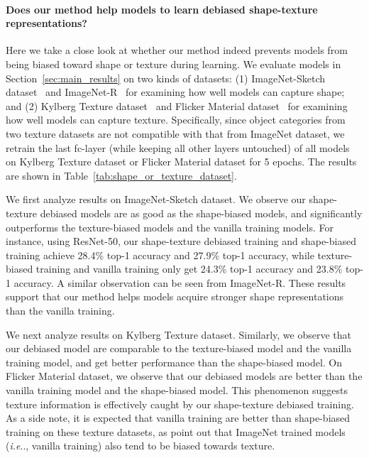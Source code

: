 \documentclass{article} \usepackage{iclr2021_conference,times}
\makeatletter
\DeclareRobustCommand\onedot{\futurelet\@let@token\@onedot}
\def\@onedot{\ifx\@let@token.\else.\null\fi\xspace}
\def\ie{\emph{i.e}\onedot} \def\Ie{\emph{I.e}\onedot}
\makeatother
\begin{document}
\paragraph{Does our method help models to learn debiased shape-texture representations?}
Here we take a close look at whether our method indeed prevents models from being biased toward shape or texture during learning. We evaluate models in Section~\ref{sec:main_results} on two kinds of datasets: (1) ImageNet-Sketch dataset~\citep{wang2019learning} and ImageNet-R~\citep{hendrycks2020many} for examining how well models can capture shape; and
(2) Kylberg Texture dataset~\citep{kylberg2011kylberg} and Flicker Material dataset~\citep{Sharan-JoV-14} for examining how well models can capture texture. Specifically, since object categories from two texture datasets are not compatible with that from ImageNet dataset, we retrain the last fc-layer (while keeping all other layers untouched) of all models on Kylberg Texture dataset or Flicker Material dataset for 5 epochs. The results are shown in Table~\ref{tab:shape_or_texture_dataset}.

We first analyze results on ImageNet-Sketch dataset. We observe our shape-texture debiased models are as good as the shape-biased models, and significantly outperforms the texture-biased models and the vanilla training models. For instance, using ResNet-50, our shape-texture debiased training and shape-biased training achieve 28.4\% top-1 accuracy and 27.9\% top-1 accuracy, while texture-biased training and vanilla training only get 24.3\% top-1 accuracy and 23.8\% top-1 accuracy. A similar observation can be seen from ImageNet-R. These results support that our method helps models acquire stronger shape representations than the vanilla training. 

We next analyze results on Kylberg Texture dataset. Similarly, we observe that our debiased model are comparable to the texture-biased model and the vanilla training model, and get better performance than the shape-biased model. On Flicker Material dataset, we observe that our debiased models are better than the vanilla training model and the shape-biased model. This phenomenon suggests texture information is effectively caught by our shape-texture debiased training.
As a side note, it is expected that vanilla training are better than shape-biased training on these texture datasets, as \citet{geirhos2018imagenettrained} point out that ImageNet trained models (\ie, vanilla training) also tend to be biased towards texture.
\end{document}
